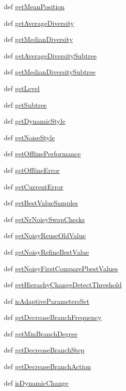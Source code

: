 \begin{CompactItemize}
\item 
def \hyperlink{classpso_1_1PSO_f2e1cb8381ee8b0cb7807c72616c3a06}{getMeanPosition}
\item 
def \hyperlink{classpso_1_1PSO_b5d0e59ce4a35669da228e42221e4404}{getAverageDiversity}
\item 
def \hyperlink{classpso_1_1PSO_dc2ade6c497fad83633c2b63ad8a385d}{getMedianDiversity}
\item 
def \hyperlink{classpso_1_1PSO_56c6f87ef898eb6d92d6a7220d8b33d9}{getAverageDiversitySubtree}
\item 
def \hyperlink{classpso_1_1PSO_3589981e41f1d2daafd0b65f2e6561c6}{getMedianDiversitySubtree}
\item 
def \hyperlink{classpso_1_1PSO_bbaf7370958d0a4f8f86f88191fe8d7b}{getLevel}
\item 
def \hyperlink{classpso_1_1PSO_7739fcbeaef55dfe76916f3088af860f}{getSubtree}
\item 
def \hyperlink{classpso_1_1PSO_02114aa1dc7e5d1b8463d67d24f3c440}{getDynamicStyle}
\item 
def \hyperlink{classpso_1_1PSO_1e49018511c49cc070a80d3085fed9db}{getNoiseStyle}
\item 
def \hyperlink{classpso_1_1PSO_3a42de8b0c1ae242c319c1c042db657c}{getOfflinePerformance}
\item 
def \hyperlink{classpso_1_1PSO_e340c3bd5e87c15f24fa579bacd20bf4}{getOfflineError}
\item 
def \hyperlink{classpso_1_1PSO_125ff8d304555b6738e44b77fd98bf93}{getCurrentError}
\item 
def \hyperlink{classpso_1_1PSO_59f1f5e33c820577efa339c0663d1f6f}{getBestValueSamples}
\item 
def \hyperlink{classpso_1_1PSO_6516fcd45c862c99931f98fbde1d03f7}{getNrNoisySwapChecks}
\item 
def \hyperlink{classpso_1_1PSO_6bd6f63cdf06f9038e579b198ba54fba}{getNoisyReuseOldValue}
\item 
def \hyperlink{classpso_1_1PSO_5c6f96e9b7e5b6251c44bed611227951}{getNoisyRefineBestValue}
\item 
def \hyperlink{classpso_1_1PSO_78d7007ee5822712e03e67166463d7a9}{getNoisyFirstComparePbestValues}
\item 
def \hyperlink{classpso_1_1PSO_ec083d02d530c27901bfa666b9c62fc6}{getHierachyChangeDetectThreshold}
\item 
def \hyperlink{classpso_1_1PSO_977a3c6edd7071e749095c222bbaadfe}{isAdaptiveParametersSet}
\item 
def \hyperlink{classpso_1_1PSO_75b9e481f2c0b0fe994c668419a79af4}{getDecreaseBranchFrequency}
\item 
def \hyperlink{classpso_1_1PSO_12ba39ca901b9ae43ad7913c709be07d}{getMinBranchDegree}
\item 
def \hyperlink{classpso_1_1PSO_1b681fd80c8a66e8995248302492b61a}{getDecreaseBranchStep}
\item 
def \hyperlink{classpso_1_1PSO_ca04d22cce6f040c71fa7df3ac3e46d4}{getDecreaseBranchAction}
\item 
def \hyperlink{classpso_1_1PSO_417c0009e4dc2b3d8a73454d1eb4423b}{isDynamicChange}
\end{CompactItemize}
